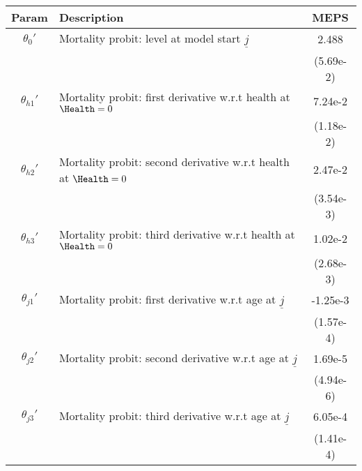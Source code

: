 \begin{table}[ht]\label{MEPSmenMortParams}
\footnotesize
\begin{center}
\begin{tabular}{clc}
\hline \hline
Param & Description & MEPS \\
\hline
$\theta_{0}'$ & Mortality probit: level at model start $\underline{j}$ & 2.488 \\
 & & (5.69e-2) \\
$\theta_{h1}'$ & Mortality probit: first derivative w.r.t health at $\Health=0$ & 7.24e-2 \\
 & & (1.18e-2) \\
$\theta_{h2}'$ & Mortality probit: second derivative w.r.t health at $\Health=0$ & 2.47e-2 \\
 & & (3.54e-3) \\
$\theta_{h3}'$ & Mortality probit: third derivative w.r.t health at $\Health=0$ & 1.02e-2 \\
 & & (2.68e-3) \\
$\theta_{j1}'$ & Mortality probit: first derivative w.r.t age at $\underline{j}$ & -1.25e-3 \\
 & & (1.57e-4) \\
$\theta_{j2}'$ & Mortality probit: second derivative w.r.t age at $\underline{j}$ & 1.69e-5 \\
 & & (4.94e-6) \\
$\theta_{j3}'$ & Mortality probit: third derivative w.r.t age at $\underline{j}$ & 6.05e-4 \\
 & & (1.41e-4) \\
\hline\hline
\end{tabular}
\end{center}
\end{table}

